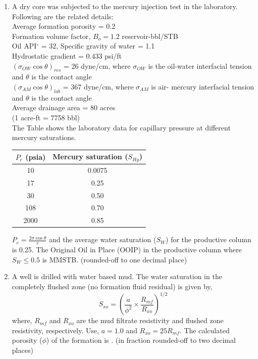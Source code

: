 \documentclass[12pt,a4paper]{article}
\begin{document}
\begin{enumerate}
\item A dry core was subjected to the mercury injection test in the laboratory. Following are the related details: \\ 
Average formation porosity = 0.2 \\ 
Formation volume factor, $B_o = 1.2$ reservoir-bbl/STB \\ 
Oil API$^\circ$ = 32, Specific gravity of water = 1.1 \\ 
Hydrostatic gradient = 0.433 psi/ft \\ 
$(\sigma_{OW} \cos \theta)_{res}$ = 26 dyne/cm, where $\sigma_{OW}$ is the oil-water interfacial tension and $\theta$ is the contact angle \\ 
$(\sigma_{AM} \cos \theta)_{lab}$ = 367 dyne/cm, where $\sigma_{AM}$ is air- mercury interfacial tension and $\theta$ is the contact angle \\ 
Average drainage area = 80 acres \\ 
(1 acre-ft = 7758 bbl) \\ 

The Table shows the laboratory data for capillary pressure at different mercury saturations.

\vspace{0.3cm}
\begin{tabular}{|c|c|}
\hline
$P_c$ (psia) & Mercury saturation ($S_{Hg}$) \\
\hline
10 & 0.0075 \\
17 & 0.25 \\
30 & 0.50 \\
108 & 0.70 \\
2000 & 0.85 \\
\hline
\end{tabular}

\vspace{0.3cm}
$P_c = \frac{2\sigma \cos \theta}{r}$ and the average water saturation ($S_W$) for the productive column is 0.25. The Original Oil in Place (OOIP) in the productive column where $S_W \leq 0.5$ is \underline{\hspace{2cm}} MMSTB. (rounded-off to one decimal place) \hfill{}


\item A well is drilled with water based mud. The water saturation in the completely flushed zone (no formation fluid residual) is given by, 
\[ S_{xo} = \left( \frac{a}{\phi^2} \times \frac{R_{mf}}{R_{xo}} \right)^{1/2} \]
where, $R_{mf}$ and $R_{xo}$ are the mud filtrate resistivity and flushed zone resistivity, respectively. Use, $a = 1.0$ and $R_{xo} = 25 R_{mf}$. 
The calculated porosity ($\phi$) of the formation is \underline{\hspace{2cm}}. (in fraction rounded-off to two decimal places) \hfill{}




\end{enumerate}
\end{document}

